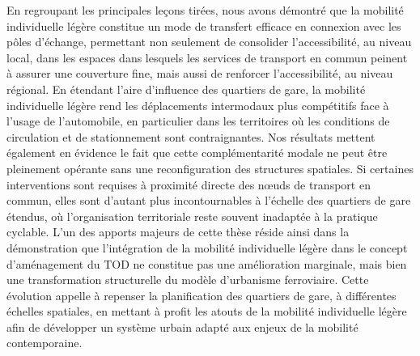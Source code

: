 \begin{refsegment}
En regroupant les principales leçons tirées, nous avons démontré que la mobilité individuelle légère constitue un mode de transfert efficace en connexion avec les pôles d'échange, permettant non seulement de consolider l'\gls{accessibilité}, au niveau local, dans les espaces dans lesquels les services de \gls{transport en commun} peinent à assurer une couverture fine, mais aussi de renforcer l'accessibilité, au niveau régional. En étendant l’aire d’influence des quartiers de gare, la mobilité individuelle légère rend les déplacements intermodaux plus compétitifs face à l’usage de l'automobile, en particulier dans les territoires où les conditions de circulation et de stationnement sont contraignantes. Nos résultats mettent également en évidence le fait que cette complémentarité modale ne peut être pleinement opérante sans une reconfiguration des structures spatiales. Si certaines interventions sont requises à proximité directe des nœuds de transport en commun, elles sont d’autant plus incontournables à l’échelle des quartiers de gare étendus, où l’organisation territoriale reste souvent inadaptée à la pratique cyclable. L’un des apports majeurs de cette thèse réside ainsi dans la démonstration que l’intégration de la mobilité individuelle légère dans le concept d'aménagement du \acrshort{TOD} ne constitue pas une amélioration marginale, mais bien une transformation structurelle du modèle d’urbanisme ferroviaire. Cette évolution appelle à repenser la planification des quartiers de gare, à différentes échelles spatiales, en mettant à profit les atouts de la mobilité individuelle légère afin de développer un système urbain adapté aux enjeux de la mobilité contemporaine.%


\end{refsegment}

